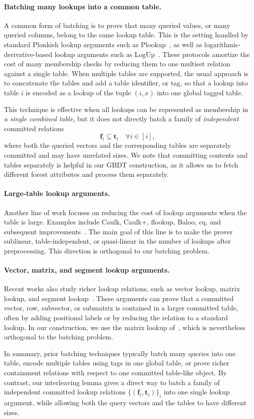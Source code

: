 \paragraph{Batching many lookups into a common table.}
A common form of batching is to prove that many queried values, or many queried
columns, belong to the same lookup table.
This is the setting handled by standard Plonkish lookup arguments such as
Plookup~\cite{plookup20},
as well as logarithmic-derivative-based lookup arguments such as
LogUp~\cite{logup22}.
These protocols amortize the cost of many membership checks by reducing them to
one multiset relation against a single table.
When multiple tables are supported, the usual approach is to concatenate the
tables and add a table identifier, or tag, so that a lookup into table $i$ is
encoded as a lookup of the tuple $(i,x)$ into one global tagged table.

This technique is effective when all lookups can be represented as membership
in \emph{a single combined table}, but it does not directly batch a family of
\emph{independent} committed relations
\[
    \mathbf{f}_i \subseteq \mathbf{t}_i
    \quad \forall i\in [i],
\]
where both the queried vectors and the corresponding tables are separately
committed and may have unrelated sizes.
We note that committing contents and tables separately is
helpful in our GBDT construction, as it allows us to 
fetch different forest attributes and process them separately.

\paragraph{Large-table lookup arguments.}
Another line of work focuses on reducing the cost of lookup arguments when the
table is large.
Examples include Caulk, Caulk+, flookup, Baloo, cq, and subsequent
improvements~\cite{caulk22,caulk+22,flookup22,baloo25,cq22,locq24}.
The main goal of this line is to make the prover sublinear, table-independent, or
quasi-linear in the number of lookups after preprocessing.
This direction is orthogonal to our batching problem.

\paragraph{Vector, matrix, and segment lookup arguments.}
Recent works also study richer lookup relations, such as vector lookup,
matrix lookup, and segment lookup~\cite{cq++24,sublonk24}.
These arguments can prove that a committed vector, row, subvector, or submatrix
is contained in a larger committed table, often by adding positional labels or
by reducing the relation to a standard lookup.
In our construction, we use the matrix lookup of~\cite{cq++24},
which is nevertheless orthogonal to the batching problem.

In summary, prior batching techniques typically batch many queries into one
table, encode multiple tables using tags in one global table, or prove richer
containment relations with respect to one committed table-like object.
By contrast, our interleaving lemma gives a direct way to batch a family of
independent committed lookup relations
$\{(\mathbf{f}_i,\mathbf{t}_i)\}_i$ into 
one single lookup argument,
while allowing both the
query vectors and the tables to have different sizes.
